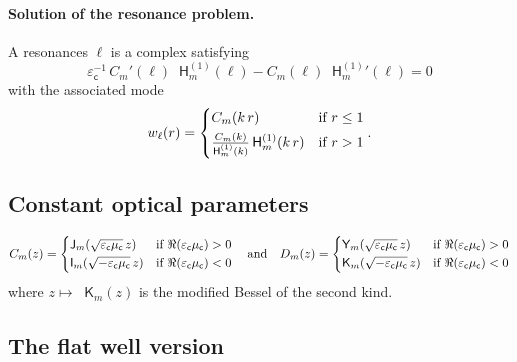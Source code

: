 \documentclass[12pt,a4paper]{article}
\newcommand{\bJ}{\mathop{}\!\mathsf{J}}
\newcommand{\bY}{\mathop{}\!\mathsf{Y}}
\newcommand{\Hu}{\mathop{}\!\mathsf{H}^{(1)}}
\newcommand{\bI}{\mathop{}\!\mathsf{I}}
\newcommand{\bK}{\mathop{}\!\mathsf{K}}
\newcommand{\ecav}{\varepsilon_\mathsf{c}}
\newcommand{\mcav}{\mu_\mathsf{c}}
\begin{document}
\paragraph{Solution of the resonance problem.}
A resonances $\ell$ is a complex satisfying
\begin{equation}
    \ecav^{-1}\, C_m'(\ell) \Hu_m(\ell) - C_m(\ell) {\Hu_m}'(\ell) = 0
\end{equation}
with the associated mode
\begin{equation}
    w_\ell(r) = \begin{dcases}
        C_m(k\, r) & \text{if } r \le 1\\
        \tfrac{C_m(k)}{\Hu_m(k)}\Hu_m(k\, r) & \text{if } r > 1
    \end{dcases}.
\end{equation}

\subsection{Constant optical parameters}

\[
    C_m(z) = \begin{dcases}
        \bJ_m(\sqrt{\ecav\mcav}\, z) & \text{if } \Re(\ecav\mcav) > 0\\
        \bI_m(\sqrt{-\ecav\mcav}\, z) & \text{if } \Re(\ecav\mcav) < 0
    \end{dcases} \quad
    \text{and} \quad
    D_m(z) = \begin{dcases}
        \bY_m(\sqrt{\ecav\mcav}\, z) & \text{if } \Re(\ecav\mcav) > 0\\
        \bK_m(\sqrt{-\ecav\mcav}\, z) & \text{if } \Re(\ecav\mcav) < 0
    \end{dcases}
\]
where $z \mapsto \bK_m(z)$ is the modified Bessel of the second kind.

\subsection{The flat well version}




\end{document}
